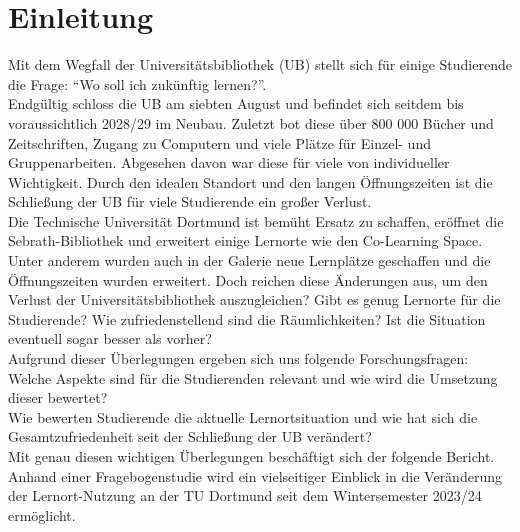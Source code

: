 \documentclass[11pt, a4paper]{article}
\begin{document}
\section{Einleitung}
\label{Einleitung}
Mit dem Wegfall der Universitätsbibliothek (UB) stellt sich für einige Studierende die Frage: “Wo soll ich zukünftig lernen?”.\\
Endgültig schloss die UB am siebten August und befindet sich seitdem bis voraussichtlich 2028/29 im Neubau. Zuletzt bot diese über 800 000 Bücher und Zeitschriften, Zugang zu Computern und viele Plätze für Einzel- und Gruppenarbeiten. Abgesehen davon war diese für viele von individueller Wichtigkeit.
Durch den idealen Standort und den langen Öffnungszeiten ist die Schließung der UB für viele Studierende ein großer Verlust.\\
Die Technische Universität Dortmund ist bemüht Ersatz zu schaffen, eröffnet die Sebrath-Bibliothek und erweitert einige Lernorte wie den Co-Learning Space.
Unter anderem wurden auch in der Galerie neue Lernplätze geschaffen und die Öffnungszeiten wurden erweitert.
Doch reichen diese Änderungen aus, um den Verlust der Universitätsbibliothek auszugleichen?
Gibt es genug Lernorte für die Studierende? Wie zufriedenstellend sind die Räumlichkeiten? Ist die Situation eventuell sogar besser als vorher?\\

\vspace{-0.2cm}
Aufgrund dieser Überlegungen ergeben sich uns folgende Forschungsfragen:\\
Welche Aspekte sind für die Studierenden relevant und wie wird die Umsetzung dieser bewertet?\\
Wie bewerten Studierende die aktuelle Lernortsituation und wie hat sich die Gesamtzufriedenheit seit der Schließung der UB verändert?\\
Mit genau diesen wichtigen Überlegungen beschäftigt sich der folgende Bericht.
Anhand einer Fragebogenstudie wird ein vielseitiger Einblick in die Veränderung der Lernort-Nutzung an der TU Dortmund seit dem Wintersemester 2023/24 ermöglicht.
\end{document}
